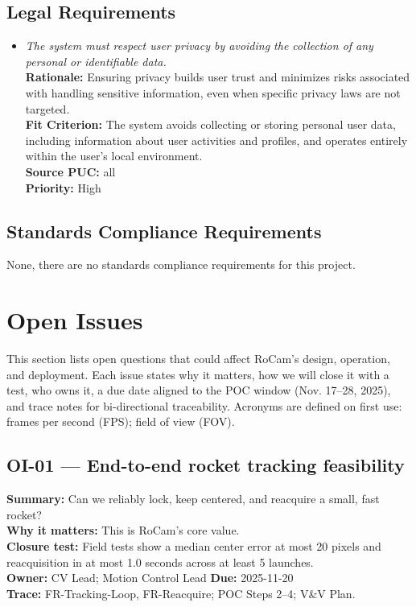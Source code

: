 \documentclass[12pt]{article}
\begin{document}
\subsection{Legal Requirements}
\begin{itemize}[leftmargin=*]
  \item[LR-1] \emph{The system must respect user privacy by avoiding the collection of
          any personal or identifiable data.}\\[2mm]
        \textbf{Rationale:} Ensuring privacy builds user trust and minimizes risks associated with handling sensitive information, even when specific privacy laws are not targeted.\\
        \textbf{Fit Criterion:} The system avoids collecting or storing personal user data, including information about user activities and profiles, and operates entirely within the user's local environment.\\
        \textbf{Source PUC:} all \\
        \textbf{Priority:} High
\end{itemize}

\subsection{Standards Compliance Requirements}

None, there are no standards compliance requirements for this project.

\section{Open Issues}
\label{sec:open-issues}

This section lists open questions that could affect RoCam’s design, operation,
and deployment. Each issue states why it matters, how we will close it with a
test, who owns it, a due date aligned to the POC window (Nov. 17–28, 2025), and
trace notes for bi-directional traceability. Acronyms are defined on first use:
frames per second (FPS); field of view (FOV).

\subsection*{OI-01 — End-to-end rocket tracking feasibility}
\textbf{Summary:} Can we reliably lock, keep centered, and reacquire a small, fast rocket?\\
\textbf{Why it matters:} This is RoCam’s core value.\\
\textbf{Closure test:} Field tests show a median center error at most 20 pixels and reacquisition in at most 1.0 seconds across at least 5 launches.\\
\textbf{Owner:} CV Lead; Motion Control Lead \quad \textbf{Due:} 2025-11-20\\
\textbf{Trace:} FR-Tracking-Loop, FR-Reacquire; POC Steps 2–4; V\&V Plan.
\end{document}
